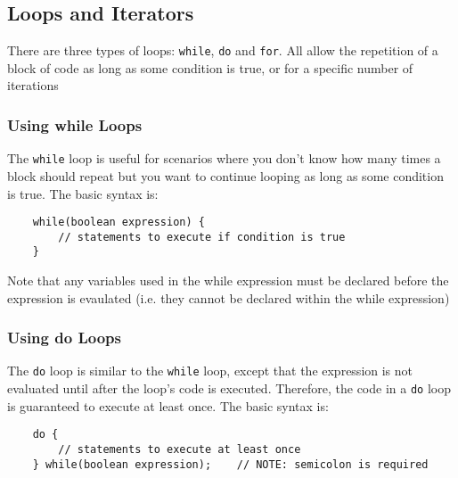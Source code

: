 \subsection{Loops and Iterators}
There are three types of loops: \verb#while#, \verb#do# and \verb#for#. All 
allow the repetition of a block of code as long as some condition is true, or 
for a specific number of iterations

\subsubsection{Using while Loops}
The \verb#while# loop is useful for scenarios where you don't know how many 
times a block should repeat but you want to continue looping as long as some 
condition is true. The basic syntax is:
\begin{verbatim}
    while(boolean expression) {
        // statements to execute if condition is true
    }
\end{verbatim}
Note that any variables used in the while expression must be declared before 
the expression is evaulated (i.e. they cannot be declared within the while 
expression)

\subsubsection{Using do Loops}
The \verb#do# loop is similar to the \verb#while# loop, except that the 
expression is not evaluated until after the loop's code is executed. Therefore, 
the code in a \verb#do# loop is guaranteed to execute at least once. The basic 
syntax is:
\begin{verbatim}
    do {
        // statements to execute at least once
    } while(boolean expression);    // NOTE: semicolon is required
\end{verbatim}


